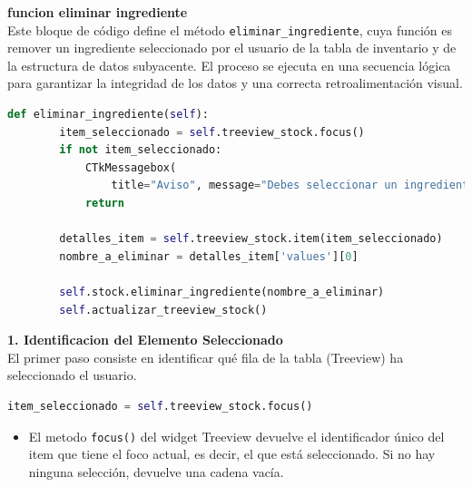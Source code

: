 \documentclass[a4paper,12pt]{article}
\begin{document}
\textbf{funcion eliminar ingrediente}\\
Este bloque de código define el método \verb|eliminar_ingrediente|, cuya función es remover un ingrediente seleccionado por el usuario de la tabla de inventario y de la estructura de datos subyacente. El proceso se ejecuta en una secuencia lógica para garantizar la integridad de los datos y una correcta retroalimentación visual.
\begin{lstlisting}[language=Python, caption={implementacion de codigo}, frame=single]
def eliminar_ingrediente(self):
        item_seleccionado = self.treeview_stock.focus()
        if not item_seleccionado:
            CTkMessagebox(
                title="Aviso", message="Debes seleccionar un ingrediente de la tabla.", icon="warning")
            return

        detalles_item = self.treeview_stock.item(item_seleccionado)
        nombre_a_eliminar = detalles_item['values'][0]

        self.stock.eliminar_ingrediente(nombre_a_eliminar)
        self.actualizar_treeview_stock()
\end{lstlisting}

\newpage
\textbf{1. Identificacion del Elemento Seleccionado}\\
El primer paso consiste en identificar qué fila de la tabla (Treeview) ha seleccionado el usuario.
\begin{lstlisting}[language=Python, caption={desenglosando codigo}, frame=single]
    item_seleccionado = self.treeview_stock.focus()
\end{lstlisting}

\begin{itemize} 
\item El metodo \verb|focus()| del widget Treeview devuelve el identificador único del item que tiene el foco actual, es decir, el que está seleccionado. Si no hay ninguna selección, devuelve una cadena vacía. \end{itemize}
\end{document}

